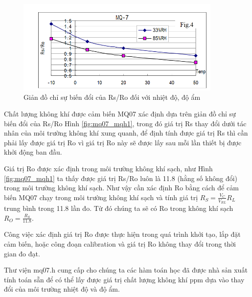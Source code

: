 \begin{figure}[H]
\centering    
\includegraphics[width=0.9\textwidth]{mq07_mqh2}
\caption[Giản đồ chỉ sự biến đổi của Rs/Ro đối với nhiệt độ, độ ẩm]{Giản đồ chỉ sự biến đổi của Rs/Ro đối với nhiệt độ, độ ẩm}
\label{fig:mq07_mqh2}
\end{figure}


Chất lượng không khí được cảm biến MQ07 xác định dựa trên giản đồ chỉ sự biến đổi của Rs/Ro Hình \ref{fig:mq07_mqh1}, trong đó giá trị Rs thay đổi dưới tác nhân của môi trường không khí xung quanh, để định tính được giá trị Rs thì cần phải lấy được giá trị Ro vì giá trị Ro này sẽ được lấy sau mỗi lần thiết bị được khởi động ban đầu. 

Giá trị Ro được xác định trong môi trường không khí sạch, như Hình \ref{fig:mq07_mqh1} ta thấy được giá trị Rs/Ro luôn là 11.8 (hằng số không đổi) trong môi trường không khí sạch. Như vậy cần xác định Ro bằng cách để cảm biến MQ07 chạy trong môi trường không khí sạch và tính giá trị $R_{S}=\frac{V_{C}}{V_{RL}}R_{L}$ trung bình trong 11.8 lần đo. Từ đó chúng ta sẽ có Ro trong không khí sạch $R_{O} = \frac{R_{S}}{11.8}$.

Công việc xác định giá trị Ro được thực hiện trong quá trình khởi tạo, lắp đặt cảm biến, hoặc công đoạn calibration và giá trị Ro không thay đổi trong thời gian đo đạt.

Thư viện mq07.h cung cấp cho chúng ta các hàm toán học đã được nhà sản xuất tính toán sẵn để có thể lấy được giá trị chất lượng không khí ppm dựa vào thay đổi của môi trường nhiệt độ và độ ẩm.



